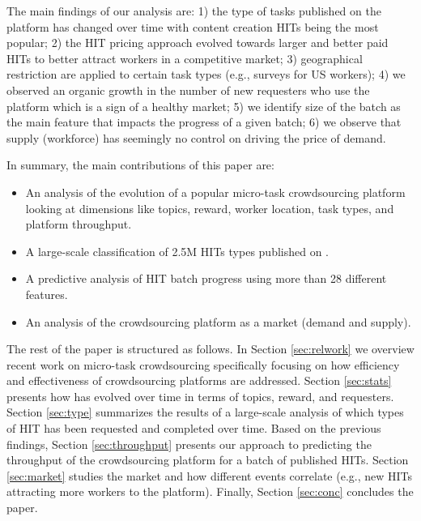 The main findings of our analysis are: 1) the type of tasks published on the platform has changed over time with content creation HITs being the most popular; 2) the HIT pricing approach evolved towards larger and better paid HITs to better attract workers in a competitive market; 3) geographical restriction are applied to certain task types (e.g., surveys for US workers); 4) we observed an organic growth in the number of new requesters who use the platform which is a sign of a healthy market; 5) we identify size of the batch as the main feature that impacts the progress of a given batch; 6) we observe that supply (workforce) has seemingly no control on driving the price of demand.

In summary, the main contributions of this paper are:
\begin{itemize}[noitemsep,topsep=0pt,parsep=0pt,partopsep=0pt]

	\item An analysis of the evolution of a popular micro-task crowdsourcing platform looking at dimensions like topics, reward, worker location, task types, and platform throughput.

	\item A large-scale classification of 2.5M HITs types published on \amt{}.

	\item A predictive analysis of HIT batch progress using more than 28 different features.
	
	\item An analysis of the crowdsourcing platform as a market (demand and supply).
	
\end{itemize}


The rest of the paper is structured as follows.
In Section \ref{sec:relwork} we overview recent work on micro-task crowdsourcing specifically focusing on how  efficiency and effectiveness  of crowdsourcing platforms are addressed.
Section \ref{sec:stats} presents how \amt{} has evolved over time in terms of topics, reward, and requesters.
Section \ref{sec:type} summarizes the results of a large-scale analysis of which types of HIT has been requested and completed over time.
Based on the previous findings, Section \ref{sec:throughput} presents our approach to predicting the throughput of the crowdsourcing platform for a batch of published HITs.
Section \ref{sec:market} studies the \amt{} market and how different events correlate (e.g., new HITs attracting more workers to the platform).
Finally, Section \ref{sec:conc} concludes the paper.

